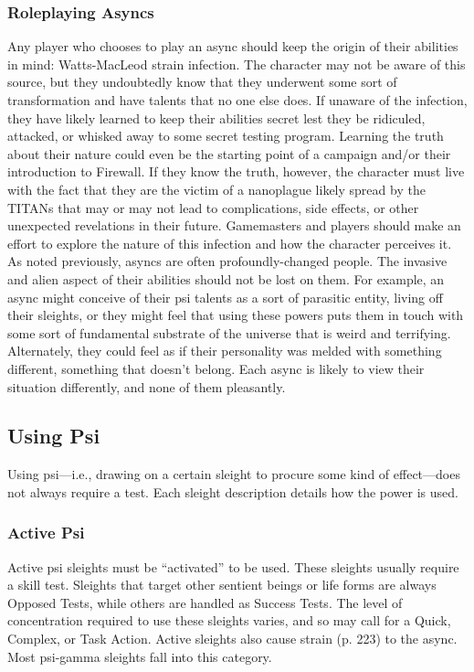 \subsubsection{Roleplaying Asyncs}

Any player who chooses to play an async should keep
the origin of their abilities in mind: Watts-MacLeod
strain infection. The character may not be aware of
this source, but they undoubtedly know that they underwent
some sort of transformation and have talents
that no one else does. If unaware of the infection, they
have likely learned to keep their abilities secret lest
they be ridiculed, attacked, or whisked away to some
secret testing program. Learning the truth about their
nature could even be the starting point of a campaign
and/or their introduction to Firewall. If they know the
truth, however, the character must live with the fact
that they are the victim of a nanoplague likely spread
by the TITANs that may or may not lead to complications,
side effects, or other unexpected revelations in
their future.
Gamemasters and players should make an effort
to explore the nature of this infection and how the
character perceives it. As noted previously, asyncs are
often profoundly-changed people. The invasive and
alien aspect of their abilities should not be lost on
them. For example, an async might conceive of their
psi talents as a sort of parasitic entity, living off their
sleights, or they might feel that using these powers
puts them in touch with some sort of fundamental
substrate of the universe that is weird and terrifying.
Alternately, they could feel as if their personality was
melded with something different, something that
doesn’t belong. Each async is likely to view their situation
differently, and none of them pleasantly.

\subsection{Using Psi}

Using psi—i.e., drawing on a certain sleight to procure
some kind of effect—does not always require a
test. Each sleight description details how the power
is used.

\subsubsection{Active Psi}

Active psi sleights must be “activated” to be used.
These sleights usually require a skill test. Sleights that
target other sentient beings or life forms are always
Opposed Tests, while others are handled as Success
Tests. The level of concentration required to use these
sleights varies, and so may call for a Quick, Complex,
or Task Action. Active sleights also cause strain (p.
223) to the async. Most psi-gamma sleights fall into
this category.

